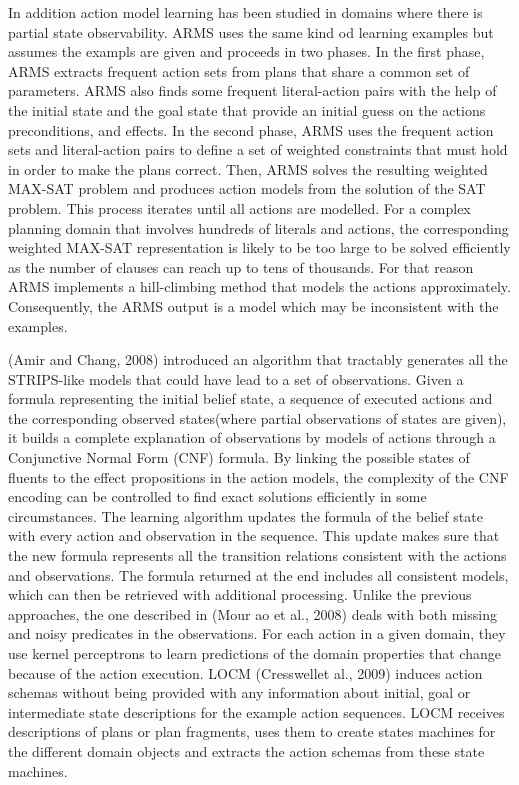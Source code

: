 \documentclass[letterpaper]{article} %
\begin{document}
In addition action model learning has been studied in domains where there is partial state observability. ARMS uses the same kind od learning examples but assumes the exampls are given and proceeds in two phases. In the first phase, ARMS extracts frequent action sets from plans that share a common set of parameters. ARMS also finds some frequent literal-action pairs with the help of the initial state and the goal state that provide an initial guess on the actions preconditions, and effects. In the second phase, ARMS uses the frequent action sets and literal-action pairs to define a set of weighted constraints that must hold in order to make the plans correct. Then, ARMS solves the resulting weighted MAX-SAT problem and produces action models from the solution of the SAT problem. This process iterates until all actions are modelled. For a complex planning domain that involves hundreds of literals and actions, the corresponding weighted MAX-SAT representation is likely to be too large to be solved efficiently as the number of clauses can reach up to tens of thousands. For that reason ARMS implements a hill-climbing method that models the actions approximately. Consequently, the ARMS output is a model which may be inconsistent with the examples.

(Amir and Chang, 2008) introduced an algorithm that tractably generates all the STRIPS-like models that  could  have  lead  to  a  set  of  observations.  Given  a  formula  representing  the  initial  belief  state,  a sequence of executed actions and the corresponding observed states(where partial observations of states are given), it builds a complete explanation of observations by models of actions through a Conjunctive Normal Form (CNF) formula. By linking the possible states of fluents to the effect propositions in the action models, the complexity of the CNF encoding can be controlled to find  exact  solutions  efficiently  in  some  circumstances.  The  learning  algorithm  updates  the  formula  of the belief state with every action and observation in the sequence. This update makes sure that the new formula represents all the transition relations consistent with the actions and observations. The formula returned at the end includes all consistent models, which can then be retrieved with additional processing. Unlike the previous approaches, the one described in (Mour ao et al., 2008) deals with both missing and noisy predicates in the observations. For each action in a given domain, they use kernel perceptrons to learn predictions of the domain properties that change because of the action execution. LOCM (Cresswellet al., 2009) induces action schemas without being provided with any information about initial, goal or intermediate state descriptions for the example action sequences. LOCM receives descriptions of plans or plan fragments, uses them to create states machines for the different domain objects and extracts the action schemas from these state machines.
\end{document}
